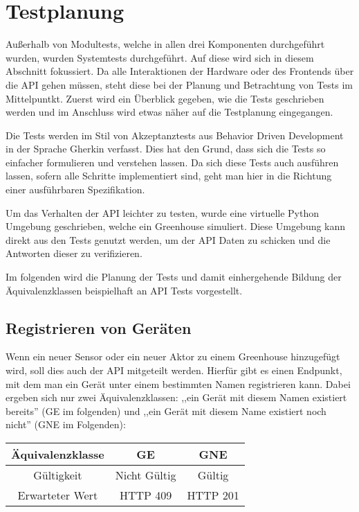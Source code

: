 \section{Testplanung}
Außerhalb von Modultests, welche in allen drei Komponenten durchgeführt wurden, wurden Systemtests durchgeführt.
Auf diese wird sich in diesem Abschnitt fokussiert.
Da alle Interaktionen der Hardware oder des Frontends über die API gehen müssen, steht diese bei der Planung und Betrachtung von Tests im Mittelpuntkt.
Zuerst wird ein Überblick gegeben, wie die Tests geschrieben werden und im Anschluss wird etwas näher auf die Testplanung eingegangen.

Die Tests werden im Stil von Akzeptanztests aus Behavior Driven Development in der Sprache Gherkin verfasst.
Dies hat den Grund, dass sich die Tests so einfacher formulieren und verstehen lassen.
Da sich diese Tests auch ausführen lassen, sofern alle Schritte implementiert sind, geht man hier in die Richtung einer ausführbaren Spezifikation.

Um das Verhalten der API leichter zu testen, wurde eine virtuelle Python Umgebung geschrieben, welche ein Greenhouse simuliert.
Diese Umgebung kann direkt aus den Tests genutzt werden, um der API Daten zu schicken und die Antworten dieser zu verifizieren.

Im folgenden wird die Planung der Tests und damit einhergehende Bildung der Äquivalenzklassen beispielhaft an API Tests vorgestellt.

\subsection{Registrieren von Geräten}
Wenn ein neuer Sensor oder ein neuer Aktor zu einem Greenhouse hinzugefügt wird, soll dies auch der API mitgeteilt werden.
Hierfür gibt es einen Endpunkt, mit dem man ein Gerät unter einem bestimmten Namen registrieren kann.
Dabei ergeben sich nur zwei Äquivalenzklassen: ,,ein Gerät mit diesem Namen existiert bereits'' (GE im folgenden) und ,,ein Gerät mit diesem Name existiert noch nicht'' (GNE im Folgenden):

\begin{center}
\small
\begin{tabular}{|c||c|c|}
\hline
Äquivalenzklasse&GE&GNE \\
\hline
Gültigkeit&Nicht Gültig&Gültig \\
\hline
Erwarteter Wert&HTTP 409&HTTP 201 \\
\hline
\end{tabular}
\end{center}

